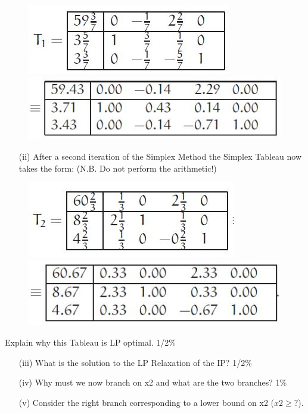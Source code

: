 \documentclass{beamer}
\begin{document}
\begin{frame}
\begin{frame}
\end{frame}
\begin{frame}
\begin{figure}
\centering
\includegraphics[width=0.7\linewidth]{Exam14-b}\\
\includegraphics[width=0.7\linewidth]{Exam14-c}
\end{figure}
\end{frame}
\begin{frame}
\begin{itemize}
\item[(ii)] After a second iteration of the Simplex Method the Simplex Tableau
now takes the form: (N.B. Do not perform the arithmetic!)
\end{itemize}

\begin{figure}
\centering
\includegraphics[width=0.7\linewidth]{Exam14-d}\\
\includegraphics[width=0.7\linewidth]{Exam14-e}
\end{figure}
\end{frame}
\begin{frame}
	\large
Explain why this Tableau is LP optimal. 1/2\%
\begin{itemize}
\item[(iii)] What is the solution to the LP Relaxation of the IP? 1/2\% \bigskip
\item[(iv)] Why must we now branch on x2 and what are the two branches? 1\%\bigskip
\item[(v)] Consider the right branch corresponding to a lower bound on x2
($x2 \geq ?$).
\end{itemize}


\end{frame}
\end{frame}
\end{document}

